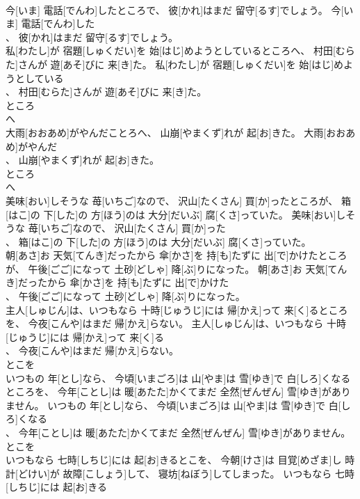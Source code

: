 \documentclass[8pt]{extreport}
\begin{document}
\begin{CJK}{UTF8}{min}
\\	今[いま] 電話[でんわ]したところで、 彼[かれ]はまだ 留守[るす]でしょう。	今[いま] 電話[でんわ]した
\\	、 彼[かれ]はまだ 留守[るす]でしょう。	
\\	私[わたし]が 宿題[しゅくだい]を 始[はじ]めようとしているところへ、 村田[むらた]さんが 遊[あそ]びに 来[き]た。	私[わたし]が 宿題[しゅくだい]を 始[はじ]めようとしている
\\	、 村田[むらた]さんが 遊[あそ]びに 来[き]た。	
\\	ところ 
\\	へ 
\\	大雨[おおあめ]がやんだことろへ、 山崩[やまくず]れが 起[お]きた。	大雨[おおあめ]がやんだ
\\	、 山崩[やまくず]れが 起[お]きた。	
\\	ところ 
\\	へ 
\\	美味[おい]しそうな 苺[いちご]なので、 沢山[たくさん] 買[か]ったところが、 箱[はこ]の 下[した]の 方[ほう]のは 大分[だいぶ] 腐[くさ]っていた。	美味[おい]しそうな 苺[いちご]なので、 沢山[たくさん] 買[か]った
\\	、 箱[はこ]の 下[した]の 方[ほう]のは 大分[だいぶ] 腐[くさ]っていた。	
\\	朝[あさ]お 天気[てんき]だったから 傘[かさ]を 持[も]たずに 出[で]かけたところが、 午後[ごご]になって 土砂[どしゃ] 降[ぶ]りになった。	朝[あさ]お 天気[てんき]だったから 傘[かさ]を 持[も]たずに 出[で]かけた
\\	、 午後[ごご]になって 土砂[どしゃ] 降[ぶ]りになった。	
\\	主人[しゅじん]は、いつもなら 十時[じゅうじ]には 帰[かえ]って 来[く]るところを、 今夜[こんや]はまだ 帰[かえ]らない。	主人[しゅじん]は、いつもなら 十時[じゅうじ]には 帰[かえ]って 来[く]る
\\	、 今夜[こんや]はまだ 帰[かえ]らない。	
\\	とこを 
\\	いつもの 年[とし]なら、 今頃[いまごろ]は 山[やま]は 雪[ゆき]で 白[しろ]くなるところを、 今年[ことし]は 暖[あたた]かくてまだ 全然[ぜんぜん] 雪[ゆき]がありません。	いつもの 年[とし]なら、 今頃[いまごろ]は 山[やま]は 雪[ゆき]で 白[しろ]くなる
\\	、 今年[ことし]は 暖[あたた]かくてまだ 全然[ぜんぜん] 雪[ゆき]がありません。	
\\	とこを 
\\	いつもなら 七時[しちじ]には 起[お]きるとこを、 今朝[けさ]は 目覚[めざま]し 時計[どけい]が 故障[こしょう]して、 寝坊[ねぼう]してしまった。	いつもなら 七時[しちじ]には 起[お]きる

\end{CJK}
\end{document}
